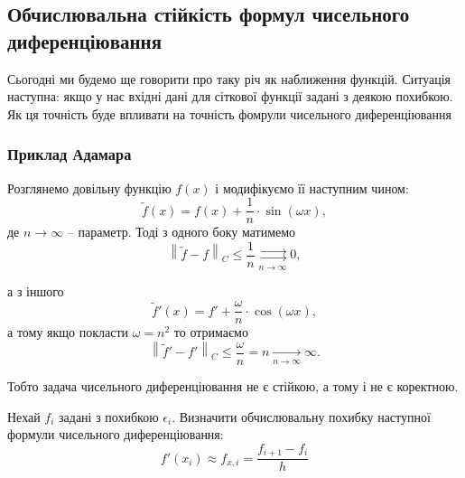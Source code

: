 \subsection{Обчислювальна стійкість формул чисельного диференціювання}

Сьогодні ми будемо ще говорити про таку річ як наближення функцій. Ситуація наступна: якщо у нас вхідні дані для сіткової функції задані з деякою похибкою. Як ця точність буде впливати на точність фомрули чисельного диференціювання

\subsubsection{Приклад Адамара}

Розглянемо довільну функцію $f(x)$ і модифікуємо її наступним чином:
\begin{equation*}
	\tilde f(x) = f(x) + \frac{1}{n} \cdot \sin( \omega x ),
\end{equation*}
де $n \to \infty$ -- параметр. Тоді з одного боку матимемо
\begin{equation*}
	\left\| \tilde f - f \right\|_C \le \frac{1}{n} \underset{n \to \infty}{\rightrightarrows} 0,
\end{equation*}

а з іншого
\begin{equation*}
	\tilde f'(x) = f' + \frac{\omega}{n} \cdot \cos (\omega x),
\end{equation*}
а тому якщо покласти $\omega = n^2$ то отримаємо
\begin{equation*}
	\left\| \tilde f' - f' \right\|_C \le \frac{\omega}{n} = n \underset{n \to \infty}{\rightarrow} \infty.
\end{equation*}

Тобто задача чисельного диференціювання не є стійкою, а тому і не є коректною.

\begin{example*}
	Нехай $f_i$ задані з похибкою $\epsilon_i$. Визначити обчислювальну похибку наступної формули чисельного диференціювання:
	\begin{equation}
		\label{eq:1.31}
		f'(x_i) \approx f_{x, i} =  \frac{f_{i + 1} - f_i}{h}
	\end{equation}
\end{example*}

